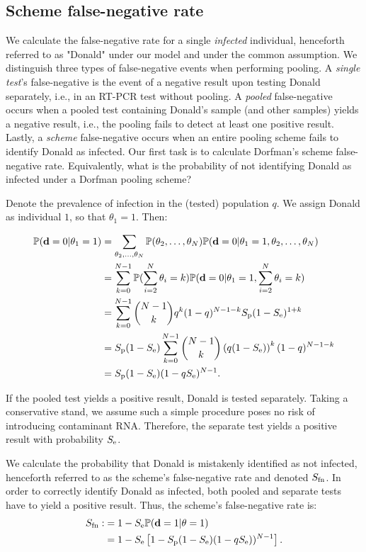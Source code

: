 \documentclass{article}
\begin{document}
\subsection*{Scheme false-negative rate}
We calculate the false-negative rate for a single \emph{infected}
individual, henceforth referred to as "Donald" under our model and
under the common assumption. We distinguish three types of
false-negative events when performing pooling. A \emph{single test}'s
false-negative is the event of a negative result upon testing Donald
separately, i.e., in an RT-PCR test without pooling. A \emph{pooled}
false-negative occurs when a pooled test containing Donald's sample
(and other samples) yields a negative result, i.e., the pooling fails
to detect at least one positive result. Lastly, a \emph{scheme}
false-negative occurs when an entire pooling scheme fails to identify
Donald as infected. Our first task is to calculate Dorfman's scheme
false-negative rate. Equivalently, what is the probability of not identifying Donald as
infected under a Dorfman pooling scheme?

Denote the prevalence of infection in the (tested) population $q$. We
assign Donald as individual $1$, so that $\theta_1=1$. Then:

\begin{align}
  \begin{split}
    \mathbb{P}(\mathbf{d}=0|\theta_1=1) &= \sum_{\theta_2,\dots,\theta_N}
    \mathbb{P}(\theta_2,\dots,\theta_N)
    \mathbb{P}(\mathbf{d}=0|\theta_1=1,\theta_2,\dots,\theta_N) \\
    &= \sum_{k=0}^{N-1}\mathbb{P}(\sum_{i=2}^N\theta_i=k)
    \mathbb{P}(\mathbf{d}=0|\theta_1=1,\sum_{i=2}^N\theta_i = k)\\
    &= \sum_{k=0}^{N-1}\binom{N-1}{k}q^k(1-q)^{N-1-k} S_\text{p}(1-S_\text{e})^{1+k}\\
    &= S_\text{p}(1-S_\text{e}) \sum_{k=0}^{N-1}\binom{N-1}{k}
    \left(q(1-S_\text{e})\right)^k(1-q)^{N-1-k}\\
    &= S_\text{p}(1-S_\text{e})(1-qS_\text{e})^{N-1}. \\
  \end{split}
\end{align}

If the pooled test yields a positive result, Donald is tested
separately. Taking a conservative stand, we assume such a simple
procedure poses no risk of introducing contaminant RNA. Therefore, the
separate test yields a positive result with probability $S_\text{e}$.

We calculate the probability that Donald is mistakenly identified as
not infected, henceforth referred to as the scheme's false-negative
rate and denoted $S_{\text{fn}}$. In order to correctly identify Donald
as infected, both pooled and separate tests have to yield a positive
result. Thus, the scheme's false-negative rate is:
\begin{align}\label{eq:sfn}
    \begin{split}
        S_{\text{fn}} :&= 1 - S_\text{e}\mathbb{P}(\mathbf{d}=1|\theta=1)\\
        &= 1 - S_\text{e}\left [1 - S_\text{p}(1-S_\text{e})(1-qS_\text{e}))^{N-1}\right].
    \end{split}
\end{align}
\end{document}
